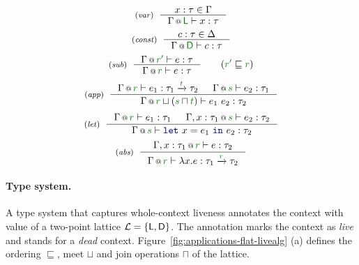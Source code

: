\begin{figure}[t]
\begin{equation*}
\tyrule{var}
  {x : \tau \in \Gamma}
  {\coctx{\Gamma}{\cclrd{\ident{L} }} \vdash x : \tau }
\end{equation*}
\begin{equation*}
\tyrule{const}
  {c : \tau \in \Delta}
  {\coctx{\Gamma}{ \cclrd{\ident{D}} } \vdash c : \tau }
\end{equation*}
\begin{equation*}
\tyrule{sub}
  {\coctx{\Gamma}{\cclrd{r'}} \vdash e : \tau }
  {\coctx{\Gamma}{\cclrd{r}} \vdash e : \tau }\quad\quad(\cclrd{r'} \sqsubseteq \cclrd{r})
\end{equation*}
\begin{equation*}
\tyrule{app}
  {\coctx{\Gamma}{\cclrd{r}} \vdash e_1 : \tau_1 \xrightarrow{\cclrd{t}} \tau_2 &
   \coctx{\Gamma}{\cclrd{s}} \vdash e_2 : \tau_1 }
  {\coctx{\Gamma}{\cclrd{r} \sqcup (\cclrd{s} \sqcap \cclrd{t})} \vdash e_1~e_2 : \tau_2}
\end{equation*}
\begin{equation*}
\tyrule{let}
  { \coctx{\Gamma}{\cclrd{r}} \vdash e_1 : \tau_1 &
    \coctx{\Gamma, x:\tau_1}{\cclrd{s}} \vdash e_2 : \tau_2}
  {\coctx{\Gamma}{\cclrd{s}} \vdash \kvd{let}~x=e_1~\kvd{in}~e_2 : \tau_2 }
\end{equation*}
\begin{equation*}
\tyrule{abs}
  {\coctx{\Gamma, x:\tau_1}{\cclrd{r}} \vdash e : \tau_2}
  {\coctx{\Gamma}{\cclrd{r}} \vdash \lambda x.e : \tau_1 \xrightarrow{\cclrd{r}} \tau_2 }
\end{equation*}
\vspace{-0.9em}

\label{fig:applications-flat-liveness}
\vspace{-1.2em}
\end{figure}


\paragraph{Type system.}
A type system that captures whole-context liveness annotates the context with value of a 
two-point lattice $\mathcal{L} = \{ \ident{L}, \ident{D} \}$. The annotation  marks
the context as \emph{live} and  stands for a \emph{dead} context. 
Figure~\ref{fig:applications-flat-livealg} (a) defines the ordering $\sqsubseteq$, meet $\sqcup$ and join 
operations $\sqcap$ of the lattice.

